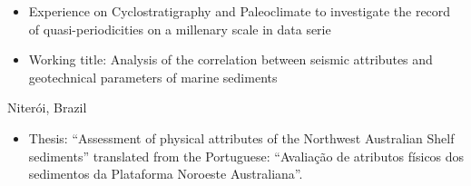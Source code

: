 \documentclass[10pt,a4paper]{altacv}
\begin{document}
\divider
{}
\begin{itemize}
\item Experience on Cyclostratigraphy and Paleoclimate to investigate the record of quasi-periodicities on a millenary scale in data serie 
\end{itemize}


\begin{itemize}
    \item Working title: Analysis of the correlation between seismic attributes and geotechnical parameters of marine sediments
\end{itemize}

\divider
{} {Niterói, Brazil}
\begin{itemize}
    \item Thesis: “Assessment of physical attributes of the Northwest Australian Shelf sediments” translated from the 
Portuguese: “Avaliação de atributos físicos dos sedimentos da Plataforma Noroeste Australiana”.
\end{itemize}







\clearpage
\end{document}
